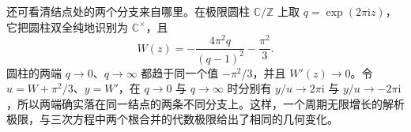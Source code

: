 还可看清结点处的两个分支来自哪里。在极限圆柱 \(\mathbb C/\mathbb Z\) 上取 \(q=\exp(2\pi\mathrm{i}z)\)，它把圆柱双全纯地识别为 \(\mathbb C^\times\)，且
\[
	W(z)=-\frac{4\pi^2q}{(q-1)^2}-\frac{\pi^2}{3}.
\]
圆柱的两端 \(q\to0\)、\(q\to\infty\) 都趋于同一个值 \(-\pi^2/3\)，并且 \(W'(z)\to0\)。令 \(u=W+\pi^2/3\)、\(y=W'\)，在 \(q\to0\) 与 \(q\to\infty\) 时分别有 \(y/u\to2\pi\mathrm{i}\) 与 \(y/u\to-2\pi\mathrm{i}\)，所以两端确实落在同一结点的两条不同分支上。这样，一个周期无限增长的解析极限，与三次方程中两个根合并的代数极限给出了相同的几何变化。
